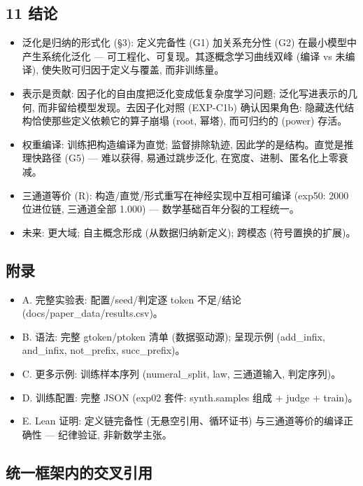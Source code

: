 \documentclass[
]{article}
\providecommand{\tightlist}{%
  \setlength{\itemsep}{0pt}\setlength{\parskip}{0pt}}
\begin{document}
\subsection{11 结论}\label{ux7ed3ux8bba}

\begin{itemize}
\tightlist
\item
  泛化是归纳的形式化 (§3): 定义完备性 (G1) 加关系充分性 (G2)
  在最小模型中产生系统化泛化 --- 可工程化、可复现。其逐概念学习曲线双峰
  (编译 vs 未编译), 使失败可归因于定义与覆盖, 而非训练量。
\item
  表示是贡献: 因子化的自由度把泛化变成低复杂度学习问题;
  泛化写进表示的几何, 而非留给模型发现。去因子化对照 (EXP-C1b)
  确认因果角色: 隐藏迭代结构恰使那些定义依赖它的算子崩塌 (root, 幂塔),
  而可归约的 (power) 存活。
\item
  权重编译: 训练把构造编译为直觉; 监督排除轨迹,
  因此学的是结构。直觉是推理快路径 (G5) --- 难以获得, 易通过跳步泛化,
  在宽度、进制、匿名化上零衰减。
\item
  三通道等价 (R): 构造/直觉/形式重写在神经实现中互相可编译 (exp50: 2000
  位进位链, 三通道全部 1.000) --- 数学基础百年分裂的工程统一。
\item
  未来: 更大域; 自主概念形成 (从数据归纳新定义); 跨模态
  (符号置换的扩展)。
\end{itemize}

\subsection{附录}\label{ux9644ux5f55}

\begin{itemize}
\tightlist
\item
  A. 完整实验表: 配置/seed/判定逐 token 不足/结论
  (docs/paper\_data/results.csv)。
\item
  B. 语法: 完整 gtoken/ptoken 清单 (数据驱动源); 呈现示例 (add\_infix,
  and\_infix, not\_prefix, succ\_prefix)。
\item
  C. 更多示例: 训练样本序列 (numeral\_split, law, 三通道输入,
  判定序列)。
\item
  D. 训练配置: 完整 JSON (exp02 套件: synth.samples 组成 + judge +
  train)。
\item
  E. Lean 证明: 定义链完备性 (无悬空引用、循环证书)
  与三通道等价的编译正确性 --- 纪律验证, 非新数学主张。
\end{itemize}

\subsection{统一框架内的交叉引用}\label{ux7edfux4e00ux6846ux67b6ux5185ux7684ux4ea4ux53c9ux5f15ux7528}
\end{document}
